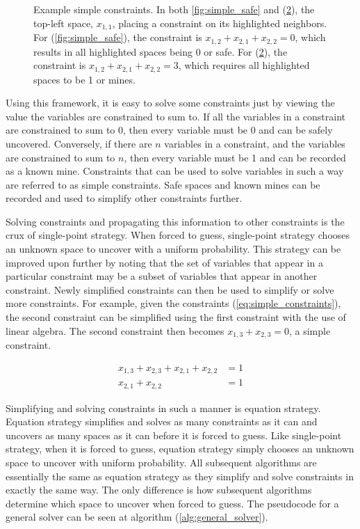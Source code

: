 \documentclass[letterpaper]{article}
\begin{document}
\begin{figure}[t]
\begin{subfigure}[b]{0.45\columnwidth}
	\caption{\label{fig:simple_mine}}
\end{subfigure}
\caption{Example simple constraints.  In both \ref{fig:simple_safe} and (\ref{fig:simple_mine}), the top-left space, $x_{1,1}$, placing a constraint on its highlighted neighbors.  For (\ref{fig:simple_safe}), the constraint is $x_{1,2} + x_{2,1} + x_{2,2} = 0$, which results in all highlighted spaces being 0 or safe.  For (\ref{fig:simple_mine}), the constraint is $x_{1,2} + x_{2,1} + x_{2,2} = 3$, which requires all highlighted spaces to be 1 or mines.}
\end{figure}

Using this framework, it is easy to solve some constraints just by viewing the value the variables are constrained to sum to.  If all the variables in a constraint are constrained to sum to 0, then every variable must be 0 and can be safely uncovered.  Conversely, if there are $n$ variables in a constraint, and the variables are constrained to sum to $n$, then every variable must be 1 and can be recorded as a known mine.  Constraints that can be used to solve variables in such a way are referred to as simple constraints.  Safe spaces and known mines can be recorded and used to simplify other constraints further.

Solving constraints and propagating this information to other constraints is the crux of single-point strategy.  When forced to guess, single-point strategy chooses an unknown space to uncover with a uniform probability.  This strategy can be improved upon further by noting that the set of variables that appear in a particular constraint may be a subset of variables that appear in another constraint.  
Newly simplified constraints can then be used to simplify or solve more constraints.  For example, given the constraints (\ref{eq:simple_constraints}), the second constraint can be simplified using the first constraint with the use of linear algebra.  The second constraint then becomes $x_{1,3} + x_{2,3} = 0$, a simple constraint.

\begin{equation}\label{eq:simple_constraints}
\begin{aligned}
x_{1,3} + x_{2,3} + x_{2,1} + x_{2,2} &= 1\\
x_{2,1} + x_{2,2} &= 1
\end{aligned}
\end{equation}

Simplifying and solving constraints in such a manner is equation strategy.  Equation strategy simplifies and solves as many constraints as it can and uncovers as many spaces as it can before it is forced to guess.  Like single-point strategy, when it is forced to guess, equation strategy simply chooses an unknown space to uncover with uniform probability.  All subsequent algorithms are essentially the same as equation strategy as they simplify and solve constraints in exactly the same way.  The only difference is how subsequent algorithms determine which space to uncover when forced to guess.  The pseudocode for a general solver can be seen at algorithm (\ref{alg:general_solver}).
\end{document}
